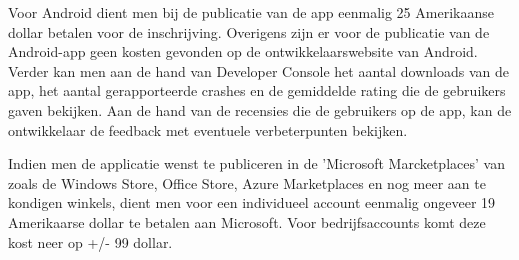 Voor Android dient men bij de publicatie van de app \cite{getstartedwithpublishingandroiddevelopers2017} eenmalig 25 Amerikaanse dollar betalen voor de inschrijving.
Overigens zijn er voor de publicatie van de Android-app geen kosten gevonden op de ontwikkelaarswebsite van Android.
Verder kan men aan de hand van Developer Console het aantal downloads van de app, het aantal gerapporteerde crashes en de gemiddelde rating die de gebruikers gaven bekijken.
Aan de hand van de recensies die de gebruikers op de app, kan de ontwikkelaar de feedback met eventuele verbeterpunten bekijken.

Indien men de applicatie wenst te publiceren in de 'Microsoft Marcketplaces' van \cite{registerasanappdeveloper2017}
 zoals de Windows Store, Office Store, Azure Marketplaces en nog meer aan te kondigen winkels, dient men voor een individueel account
 eenmalig ongeveer 19 Amerikaarse dollar te betalen aan Microsoft. Voor bedrijfsaccounts komt deze kost neer op +/- 99 dollar.
